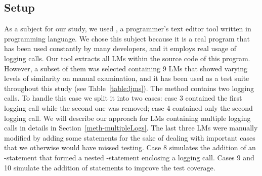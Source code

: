 \subsection{Setup}  \label{study1_setup}

As a subject for our study, we used , a programmer's text editor tool written in  programming language. We chose this subject because it is a real program that has been used constantly by many developers, and it employs real usage of logging calls. Our tool extracts all LMs within the source code of this program. However, a subset of them was selected containing 9 LMs that showed varying levels of similarity on manual examination, and it has been used as a test suite throughout this study (see Table~\ref{table:ljms}). The  method contains two logging calls. To handle this case we split it into two cases: case 3 contained the first logging call while the second one was removed; case 4 contained only the second logging call. We will describe our approach for LMs containing multiple logging calls in details in Section~\ref{meth-multipleLogs}. The last three LMs were manually modified by adding some statements for the sake of dealing with important cases that we otherwise would have missed testing. Case 8 simulates the addition of an -statement that formed a nested -statement enclosing a logging call. Cases 9 and 10 simulate the addition of statements to improve the test coverage.


